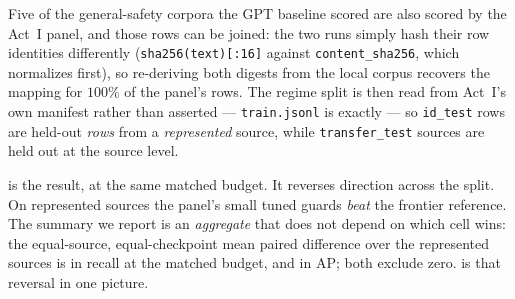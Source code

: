 \documentclass[11pt]{article}
\newcommand{\code}[1]{\texttt{\small #1}}
\begin{document}
Five of the general-safety corpora the GPT baseline scored are also scored by the Act~I panel,
and those rows can be joined: the two runs simply hash their row identities differently
(\code{sha256(text)[:16]} against \code{content\_sha256}, which normalizes first), so
re-deriving both digests from the local corpus recovers the mapping for $100\%$ of the panel's
rows. The regime split is then read from Act~I's own manifest rather than asserted ---
\code{train.jsonl} is exactly \HtwoRepSources{} --- so \code{id\_test} rows are held-out
\emph{rows} from a \emph{represented} source, while \code{transfer\_test} sources are held out
at the source level.

 is the result, at the same matched \HtwoBudget{} budget. It reverses direction
across the split. On represented sources the panel's small tuned guards \emph{beat} the frontier
reference. The summary we report is an \emph{aggregate} that does not depend on which cell wins:
the equal-source, equal-checkpoint mean paired difference over the \HtwoNRepSources{} represented
sources is \HtwoAggDeltaTpr{} \HtwoAggDeltaTprCI{} in recall at the matched budget, and
\HtwoAggDeltaAp{} \HtwoAggDeltaApCI{} in AP; both exclude zero.  is that
reversal in one picture.
\end{document}

